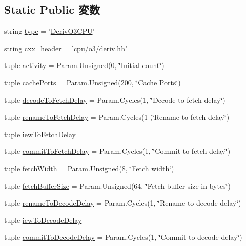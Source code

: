 \subsection*{Static Public 変数}
\begin{DoxyCompactItemize}
\item 
string \hyperlink{classO3CPU_1_1DerivO3CPU_acce15679d830831b0bbe8ebc2a60b2ca}{type} = '\hyperlink{classO3CPU_1_1DerivO3CPU}{DerivO3CPU}'
\item 
string \hyperlink{classO3CPU_1_1DerivO3CPU_a17da7064bc5c518791f0c891eff05fda}{cxx\_\-header} = 'cpu/o3/deriv.hh'
\item 
tuple \hyperlink{classO3CPU_1_1DerivO3CPU_a179708190406cb8098a70bbdfd73088c}{activity} = Param.Unsigned(0, \char`\"{}Initial count\char`\"{})
\item 
tuple \hyperlink{classO3CPU_1_1DerivO3CPU_a351bb34b2113c3ae4bd2449d92794d5a}{cachePorts} = Param.Unsigned(200, \char`\"{}Cache Ports\char`\"{})
\item 
tuple \hyperlink{classO3CPU_1_1DerivO3CPU_a9ef9ac64d6891064a22ab5d341e691f4}{decodeToFetchDelay} = Param.Cycles(1, \char`\"{}Decode to fetch delay\char`\"{})
\item 
tuple \hyperlink{classO3CPU_1_1DerivO3CPU_a8aaf587e0c65d740c68328f587f36b97}{renameToFetchDelay} = Param.Cycles(1 ,\char`\"{}Rename to fetch delay\char`\"{})
\item 
tuple \hyperlink{classO3CPU_1_1DerivO3CPU_a63165fb771c6aa1ecca842abe393a831}{iewToFetchDelay}
\item 
tuple \hyperlink{classO3CPU_1_1DerivO3CPU_aad1963f659c6e9595b5d1ff499e843d8}{commitToFetchDelay} = Param.Cycles(1, \char`\"{}Commit to fetch delay\char`\"{})
\item 
tuple \hyperlink{classO3CPU_1_1DerivO3CPU_a0a9358767ec7c9dfef70564672b53522}{fetchWidth} = Param.Unsigned(8, \char`\"{}Fetch width\char`\"{})
\item 
tuple \hyperlink{classO3CPU_1_1DerivO3CPU_a11c5a1df983c0acae9f735e73bb07acf}{fetchBufferSize} = Param.Unsigned(64, \char`\"{}Fetch buffer size in bytes\char`\"{})
\item 
tuple \hyperlink{classO3CPU_1_1DerivO3CPU_a4cd25aa163add4667be26df636d1d72d}{renameToDecodeDelay} = Param.Cycles(1, \char`\"{}Rename to decode delay\char`\"{})
\item 
tuple \hyperlink{classO3CPU_1_1DerivO3CPU_a9876f37ad91dd63a32345b53aafbddc6}{iewToDecodeDelay}
\item 
tuple \hyperlink{classO3CPU_1_1DerivO3CPU_acaab18e678264ee264642b5be0d91157}{commitToDecodeDelay} = Param.Cycles(1, \char`\"{}Commit to decode delay\char`\"{})

\end{DoxyCompactItemize}
